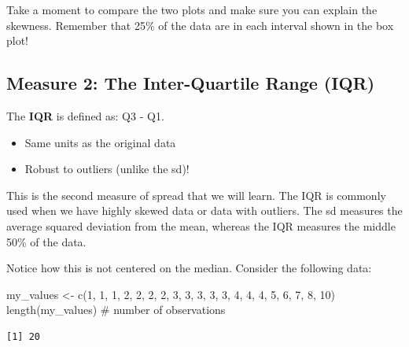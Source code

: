 \documentclass[
  letterpaper,
  DIV=11,
  numbers=noendperiod,
  oneside]{scrreprt}
\newenvironment{Shaded}{\begin{snugshade}}{\end{snugshade}}
\newcommand{\CommentTok}[1]{\textcolor[rgb]{0.37,0.37,0.37}{#1}}
\newcommand{\DecValTok}[1]{\textcolor[rgb]{0.68,0.00,0.00}{#1}}
\newcommand{\FunctionTok}[1]{\textcolor[rgb]{0.28,0.35,0.67}{#1}}
\newcommand{\NormalTok}[1]{\textcolor[rgb]{0.00,0.23,0.31}{#1}}
\newcommand{\OtherTok}[1]{\textcolor[rgb]{0.00,0.23,0.31}{#1}}
\providecommand{\tightlist}{%
  \setlength{\itemsep}{0pt}\setlength{\parskip}{0pt}}\usepackage{longtable,booktabs,array}
\begin{document}
Take a moment to compare the two plots and make sure you can explain the
skewness. Remember that 25\% of the data are in each interval shown in
the box plot!

\hypertarget{measure-2-the-inter-quartile-range-iqr}{%
\subsection{Measure 2: The Inter-Quartile Range
(IQR)}\label{measure-2-the-inter-quartile-range-iqr}}

The \textbf{IQR} is defined as: Q3 -
Q1.{}

\begin{itemize}
\tightlist
\item
  Same units as the original data
\item
  Robust to outliers (unlike the sd)!
\end{itemize}

This is the second measure of spread that we will learn. The IQR is
commonly used when we have highly skewed data or data with outliers. The
sd measures the average squared deviation from the mean, whereas the IQR
measures the middle 50\% of the data.

Notice how this is not centered on the median. Consider the following
data:

\begin{Shaded}
\begin{Highlighting}[]
\NormalTok{my\_values }\OtherTok{\textless{}{-}} \FunctionTok{c}\NormalTok{(}\DecValTok{1}\NormalTok{, }\DecValTok{1}\NormalTok{, }\DecValTok{1}\NormalTok{, }\DecValTok{2}\NormalTok{, }\DecValTok{2}\NormalTok{, }\DecValTok{2}\NormalTok{, }\DecValTok{2}\NormalTok{, }\DecValTok{3}\NormalTok{, }\DecValTok{3}\NormalTok{, }\DecValTok{3}\NormalTok{, }\DecValTok{3}\NormalTok{, }\DecValTok{3}\NormalTok{, }\DecValTok{4}\NormalTok{, }\DecValTok{4}\NormalTok{, }\DecValTok{4}\NormalTok{, }\DecValTok{5}\NormalTok{, }\DecValTok{6}\NormalTok{, }\DecValTok{7}\NormalTok{, }\DecValTok{8}\NormalTok{, }\DecValTok{10}\NormalTok{)}
\FunctionTok{length}\NormalTok{(my\_values) }\CommentTok{\# number of observations}
\end{Highlighting}
\end{Shaded}

\begin{verbatim}
[1] 20
\end{verbatim}
\end{document}
